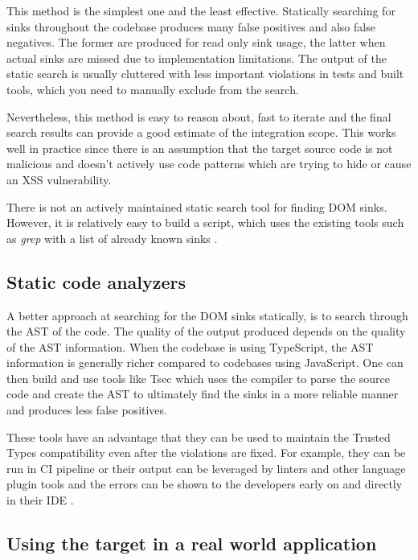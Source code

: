This method is the simplest one and the least effective. Statically searching for sinks throughout
the codebase produces many false positives and also false negatives. The former are produced for
read only sink usage, the latter when actual sinks are missed due to implementation limitations. The
output of the static search is usually cluttered with less important violations in tests and built
tools, which you need to manually exclude from the search.

Nevertheless, this method is easy to reason about, fast to iterate and the final search results can
provide a good estimate of the integration scope. This works well in practice since there is an
assumption that the target source code is not malicious and doesn't actively use code patterns which
are trying to hide or cause an XSS vulnerability.

There is not an actively maintained static search tool for finding DOM sinks. However, it is
relatively easy to build a script, which uses the existing tools such as \textit{grep} with a list
of already known sinks \cite{xss_sink_finder}.

\subsection{Static code analyzers}

A better approach at searching for the DOM sinks statically, is to search through the AST of the
code. The quality of the output produced depends on the quality of the AST information. When the
codebase is using TypeScript, the AST information is generally richer compared to codebases using
JavaScript. One can then build and use tools like Tsec \cite{tsec_github} which uses the compiler to
parse the source code and create the AST to ultimately find the sinks in a more reliable manner and
produces less false positives.

These tools have an advantage that they can be used to maintain the Trusted Types compatibility even
after the violations are fixed. For example, they can be run in CI pipeline or their output can be
leveraged by linters and other language plugin tools and the errors can be shown to the developers
early on and directly in their IDE \cite{tsec_lsp}.

\subsection{Using the target in a real world application}

